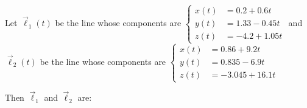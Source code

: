 \documentclass{ximera}
\author{Gregory Hartman \and Matthew Carr}
\begin{document}
\begin{exercise}




Let $\vec{\ell}_{1}(t)$ be the line whose components are $\left\{ \begin{aligned}
x(t) & =0.2+0.6t\\
y(t) & =1.33-0.45t\\
z(t) & =-4.2+1.05t
\end{aligned}
\right.$  and $\vec{\ell}_{2}(t)$ be the line whose components are $\left\{ \begin{aligned}
x(t) & =0.86+9.2t\\
y(t) & =0.835-6.9t\\
z(t) & =-3.045+16.1t
\end{aligned}
\right.$

Then $\vec{\ell}_{1}$ and $\vec{\ell}_{2}$ are: 

\begin{multipleChoice}
\end{multipleChoice}


\end{exercise}
\end{document}
